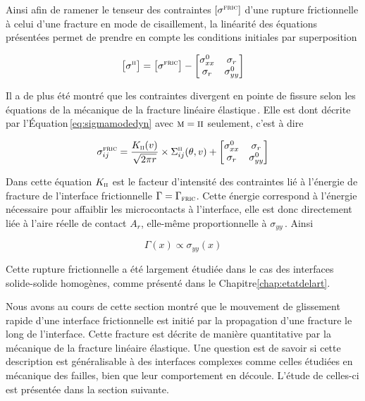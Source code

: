 Ainsi afin de ramener le tenseur des contraintes $[\sigma^\textsc{fric}]$ d'une rupture frictionnelle à celui d'une fracture en mode de cisaillement, la linéarité des équations présentées permet de prendre en compte les conditions initiales par superposition

\begin{equation}
\big[\sigma^\textsc{ii}\big] = 
\big[\sigma^\textsc{fric}\big] -
\begin{bmatrix}
\sigma_{xx}^0 & \sigma_r\\
\sigma_r      & \sigma_{yy}^0
\end{bmatrix}
\label{eq:pmpi}
\end{equation}


Il a de plus été montré que les contraintes divergent en pointe de fissure selon les équations de la mécanique de la fracture linéaire élastique\,\cite{svetlizky_classical_2014}. Elle est dont décrite par l'Équation\,\ref{eq:sigmamodedyn} avec $\textsc{m}=\textsc{ii}$ seulement, c'est à dire





\begin{equation}
\sigma_{ij}^\textsc{fric}
=
\frac
	{K_{\textsc{ii}}(v)}
	{\sqrt{2\pi r}}
\times
	\Sigma_{ij}^{\textsc{ii}}
(\theta,v)
+
\begin{bmatrix}
	\sigma_{xx}^0 & \sigma_r\\
	\sigma_r      & \sigma_{yy}^0
\end{bmatrix}
\label{eq:fracdynfric}
\end{equation}

Dans cette équation $K_\textsc{ii}$ est le facteur d'intensité des contraintes lié à l'énergie de fracture de l'interface frictionnelle $\Gamma = \Gamma_\textsc{fric}$. Cette énergie correspond à l'énergie nécessaire pour affaiblir les microcontacts à l'interface, elle est donc directement liée à l'aire réelle de contact $A_r$, elle-même proportionnelle à $\sigma_{yy}$\,\cite{svetlizky_brittle_2019}. Ainsi

\begin{equation}
\Gamma(x)\propto\sigma_{yy}(x)
\label{eq:homospa}
\end{equation}

Cette rupture frictionnelle a été largement étudiée dans le cas des interfaces solide-solide homogènes, comme présenté dans le Chapitre\:\ref{chap:etatdelart}.

Nous avons au cours de cette section montré que le mouvement de glissement rapide d'une interface frictionnelle est initié par la propagation d'une fracture le long de l'interface. Cette fracture est décrite de manière quantitative par la mécanique de la fracture linéaire élastique. Une question est de savoir si cette description est généralisable à des interfaces complexes comme celles étudiées en mécanique des failles, bien que leur comportement en découle. L'étude de celles-ci est présentée dans la section suivante.

\newpage





